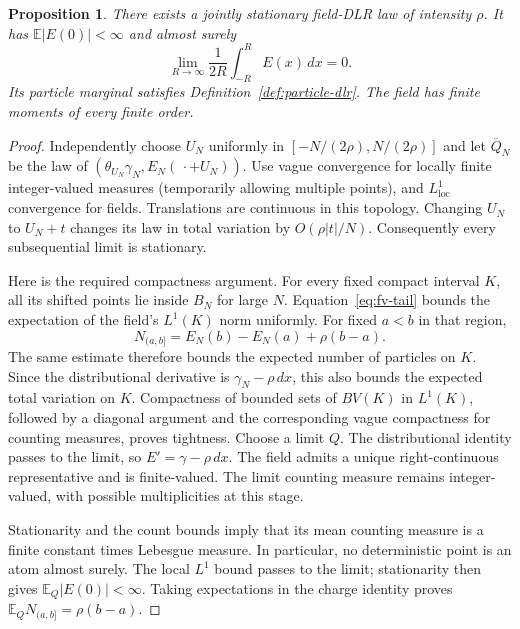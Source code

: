 \documentclass[11pt,reqno]{amsart}
\newtheorem{proposition}[theorem]{Proposition}
\theoremstyle{definition}
\theoremstyle{remark}
\newcommand{\E}{\mathbb E}
\newcommand{\1}{\mathbf 1}
\numberwithin{equation}{section}
\begin{document}
\begin{proposition}\label{prop:existence}
There exists a jointly stationary field-DLR law of intensity $\rho$.
It has $\E|E(0)|<\infty$ and almost surely
\begin{equation}\label{eq:constructed-zero-mean}
 \lim_{R\to\infty}\frac1{2R}\int_{-R}^{R}E(x)\,dx=0.
\end{equation}
Its particle marginal satisfies Definition~\ref{def:particle-dlr}.
The field has finite moments of every finite order.
\end{proposition}

\begin{proof}
Independently choose $U_N$ uniformly in
$[-N/(2\rho),N/(2\rho)]$ and let $\overline Q_N$ be the law of
$(\theta_{U_N}\gamma_N,E_N(\,\cdot+U_N))$.
Use vague convergence for locally finite integer-valued measures
(temporarily allowing multiple points), and $L^1_{\mathrm{loc}}$
convergence for fields. Translations are continuous in this topology.
Changing $U_N$ to $U_N+t$ changes its law in total variation by
$O(\rho|t|/N)$. Consequently every subsequential limit is stationary.

Here is the required compactness argument. For every fixed compact
interval $K$, all its shifted points lie inside $B_N$ for large $N$.
Equation~\eqref{eq:fv-tail} bounds the expectation of the field's
$L^1(K)$ norm uniformly. For fixed $a<b$ in that region,
\[
 N_{(a,b]}=E_N(b)-E_N(a)+\rho(b-a).
\]
The same estimate therefore bounds the expected number of particles
on $K$. Since the distributional derivative is
$\gamma_N-\rho\,dx$, this also bounds the expected total variation
on $K$. Compactness of bounded sets of $BV(K)$ in $L^1(K)$, followed
by a diagonal argument and the corresponding vague compactness for
counting measures, proves tightness. Choose a limit $Q$.
The distributional identity passes to the limit, so
$E'=\gamma-\rho\,dx$. The field admits a unique right-continuous
representative and is finite-valued. The limit counting measure remains
integer-valued, with possible multiplicities at this stage.

Stationarity and the count bounds imply that its mean counting measure
is a finite constant times Lebesgue measure. In particular, no
deterministic point is an atom almost surely. The local $L^1$ bound
passes to the limit; stationarity then gives $\E_Q|E(0)|<\infty$.
Taking expectations in the charge identity proves
$\E_Q N_{(a,b]}=\rho(b-a)$.


\end{proof}
\end{document}
